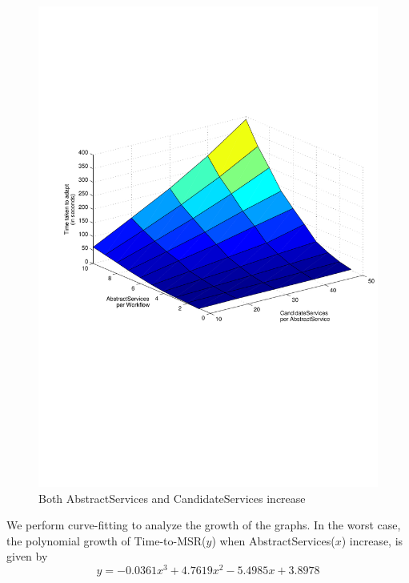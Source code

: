 \documentclass[10pt,journal,compsoc]{IEEEtran}
\begin{document}
\begin{figure}[htbp]
	\centering
	\includegraphics[clip, trim=1cm 10cm 1cm 7cm,scale=0.47]{graphs/scaling_time_task_candidates.pdf}
	\caption{Both AbstractServices and CandidateServices increase \label{fig:task_and_candidate_scaling}}
\end{figure}
% 
We perform curve-fitting to analyze the growth of the graphs. In the worst case, the polynomial growth of Time-to-MSR($y$) when AbstractServices($x$) increase, is given by
\begin{equation}
    y =  -0.0361x^{3} +   4.7619x^{2}  - 5.4985x +   3.8978 \label{eq:task_vs_cand}
\end{equation}
\end{document}

